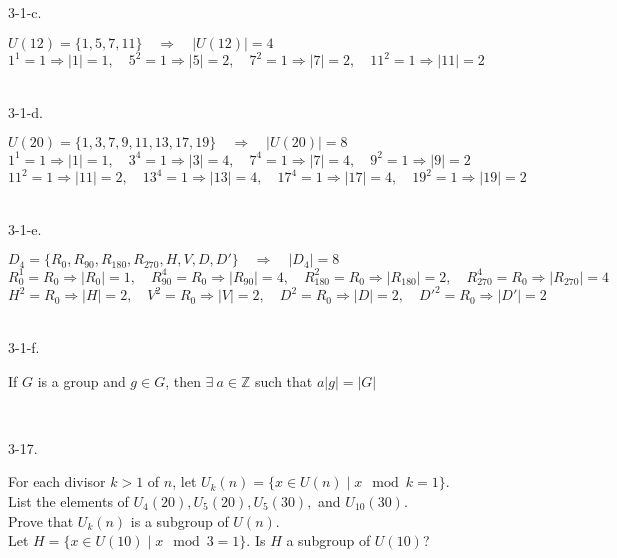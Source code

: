 \documentclass[12pt]{book}
\begin{document}
\begin{CJK}{UTF8}{bsmi}
3-1-c. \begin{minipage}[t]{\dimexpr\linewidth-2em}
$U(12)=\{1,5,7,11\}\quad\Rightarrow\quad|U(12)|=4$ \\
$1^1=1 \Rightarrow |1|=1,\quad 5^2=1 \Rightarrow |5|=2,\quad 7^2=1 \Rightarrow |7|=2,\quad 11^2=1 \Rightarrow |11|=2$ \\
\end{minipage}\\

3-1-d. \begin{minipage}[t]{\dimexpr\linewidth-2em}
$U(20)=\{1,3,7,9,11,13,17,19\}\quad\Rightarrow\quad|U(20)|=8$ \\
$1^1=1 \Rightarrow |1|=1,\quad 3^4=1 \Rightarrow |3|=4,\quad 7^4=1 \Rightarrow |7|=4,\quad 9^2=1 \Rightarrow |9|=2$ \\
$11^2=1 \Rightarrow |11|=2,\quad 13^4=1 \Rightarrow |13|=4,\quad 17^4=1 \Rightarrow |17|=4,\quad 19^2=1 \Rightarrow |19|=2$ \\
\end{minipage}\\

3-1-e. \begin{minipage}[t]{\dimexpr\linewidth-2em}
$D_4=\{R_0, R_{90}, R_{180}, R_{270}, H, V, D, D'\}\quad\Rightarrow\quad|D_4|=8$ \\
$R_0^1=R_0 \Rightarrow |R_0|=1,\quad R_{90}^4=R_0 \Rightarrow |R_{90}|=4,\quad R_{180}^2=R_0 \Rightarrow |R_{180}|=2,\quad R_{270}^4=R_{0} \Rightarrow |R_{270}|=4$ \\
$H^2=R_0 \Rightarrow |H|=2,\quad V^2=R_0 \Rightarrow |V|=2,\quad D^2=R_0 \Rightarrow |D|=2,\quad {D'}^2=R_0 \Rightarrow |D'|=2$ \\
\end{minipage}\\

3-1-f. \begin{minipage}[t]{\dimexpr\linewidth-2em}
If $G$ is a group and $g\in G$, then $\exists\ a\in\mathbb{Z}$ such that $a|g|=|G|$
\end{minipage}\\

\clearpage

3-17. \begin{minipage}[t]{\dimexpr\linewidth-2em}
For each divisor $k>1$ of $n$, let $U_k(n)=\{x\in U(n)\mid x\mod k=1\}$. \\
List the elements of $U_4(20), U_5(20), U_5(30),$ and $U_{10}(30)$. \\
Prove that $U_k(n)$ is a subgroup of $U(n)$. \\
Let $H=\{x\in U(10)\mid x\mod 3=1\}$. Is
$H$ a subgroup of $U(10)$? \\
\end{minipage}\\


\end{CJK}
\end{document}
